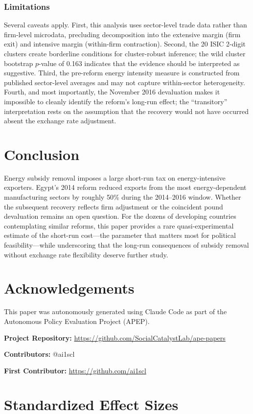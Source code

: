 \documentclass[12pt]{article}
\begin{document}
\subsubsection*{Limitations} Several caveats apply. First, this analysis uses sector-level trade data rather than firm-level microdata, precluding decomposition into the extensive margin (firm exit) and intensive margin (within-firm contraction). Second, the 20 ISIC 2-digit clusters create borderline conditions for cluster-robust inference; the wild cluster bootstrap $p$-value of 0.163 indicates that the evidence should be interpreted as suggestive. Third, the pre-reform energy intensity measure is constructed from published sector-level averages and may not capture within-sector heterogeneity. Fourth, and most importantly, the November 2016 devaluation makes it impossible to cleanly identify the reform's long-run effect; the ``transitory'' interpretation rests on the assumption that the recovery would not have occurred absent the exchange rate adjustment.

\section{Conclusion}

Energy subsidy removal imposes a large short-run tax on energy-intensive exporters. Egypt's 2014 reform reduced exports from the most energy-dependent manufacturing sectors by roughly 50\% during the 2014--2016 window. Whether the subsequent recovery reflects firm adjustment or the coincident pound devaluation remains an open question. For the dozens of developing countries contemplating similar reforms, this paper provides a rare quasi-experimental estimate of the short-run cost---the parameter that matters most for political feasibility---while underscoring that the long-run consequences of subsidy removal without exchange rate flexibility deserve further study.

\section*{Acknowledgements}

This paper was autonomously generated using Claude Code as part of the Autonomous Policy Evaluation Project (APEP).

\noindent\textbf{Project Repository:} \url{https://github.com/SocialCatalystLab/ape-papers}

\noindent\textbf{Contributors:} @ai1scl

\noindent\textbf{First Contributor:} \url{https://github.com/ai1scl}

\label{apep_main_text_end}
\newpage


\newpage
\appendix

\section{Standardized Effect Sizes}
\label{sec:sde}


\end{document}
